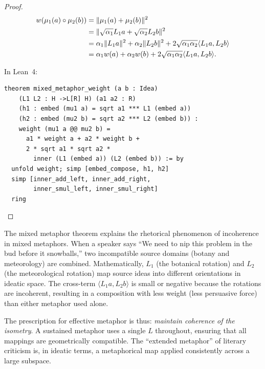 \begin{proof}
\begin{align*}
  w(\mu_1(a) \circ \mu_2(b))
  &= \|\mu_1(a) + \mu_2(b)\|^2 \\
  &= \|\sqrt{\alpha_1} L_1 a + \sqrt{\alpha_2} L_2 b\|^2 \\
  &= \alpha_1 \|L_1 a\|^2 + \alpha_2 \|L_2 b\|^2
     + 2\sqrt{\alpha_1\alpha_2} \langle L_1a, L_2b \rangle \\
  &= \alpha_1 w(a) + \alpha_2 w(b)
     + 2\sqrt{\alpha_1\alpha_2} \langle L_1a, L_2b \rangle.
\end{align*}

In Lean~4:
\begin{lstlisting}
theorem mixed_metaphor_weight (a b : Idea)
    (L1 L2 : H ->L[R] H) (a1 a2 : R)
    (h1 : embed (mu1 a) = sqrt a1 *** L1 (embed a))
    (h2 : embed (mu2 b) = sqrt a2 *** L2 (embed b)) :
    weight (mu1 a @@ mu2 b) =
      a1 * weight a + a2 * weight b +
      2 * sqrt a1 * sqrt a2 *
        inner (L1 (embed a)) (L2 (embed b)) := by
  unfold weight; simp [embed_compose, h1, h2]
  simp [inner_add_left, inner_add_right,
        inner_smul_left, inner_smul_right]
  ring
\end{lstlisting}
\end{proof}

\begin{interpretation}
\label{interp:mixed-metaphor}
The mixed metaphor theorem explains the rhetorical phenomenon of incoherence
in mixed metaphors.  When a speaker says ``We need to nip this problem in the
bud before it snowballs,'' two incompatible source domains (botany and
meteorology) are combined.  Mathematically, $L_1$ (the botanical rotation)
and $L_2$ (the meteorological rotation) map source ideas into different
orientations in ideatic space.  The cross-term
$\langle L_1a, L_2b \rangle$ is small or negative because the rotations
are incoherent, resulting in a composition with less weight (less persuasive
force) than either metaphor used alone.

The prescription for effective metaphor is thus: \emph{maintain coherence of the
isometry}.  A sustained metaphor uses a single $L$ throughout, ensuring that all
mappings are geometrically compatible.  The ``extended metaphor'' of literary
criticism is, in ideatic terms, a metaphorical map applied consistently across
a large subspace.
\end{interpretation}







